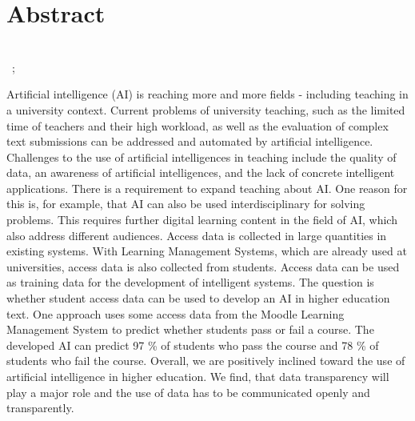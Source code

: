 \chapter*{Abstract}
\begin{center}
  \DocumentThesisTitle
  \\
  \vspace{.3cm}
  \DocumentAuthorPrename\ \DocumentAuthorName ; \DocumentSecondAuthorPrename\ \DocumentSecondAuthorName
\end{center}
Artificial intelligence (AI) is reaching more and more fields - including teaching in a university context.
Current problems of university teaching, such as the limited time of teachers and their high workload, as well as the evaluation of complex text submissions can be addressed and automated by artificial intelligence.
Challenges to the use of artificial intelligences in teaching include the quality of data, an awareness of artificial intelligences, and the lack of concrete intelligent applications.
There is a requirement to expand teaching about AI. One reason for this is, for example, that AI can also be used interdisciplinary for solving problems.
This requires further digital learning content in the field of AI, which also address different audiences. 
Access data is collected in large quantities in existing systems. With Learning Management Systems, which are already used at universities, access data is also collected from students.
Access data can be used as training data for the development of intelligent systems. The question is whether student access data can be used to develop an AI in higher education text. 
One approach uses some access data from the Moodle Learning Management System to predict whether students pass or fail a course. The developed AI can predict 97 \% of students who pass the course and 78 \% of students who fail the course.
Overall, we are positively inclined toward the use of artificial intelligence in higher education.
We find, that data transparency will play a major role and the use of data has to be communicated openly and transparently.

